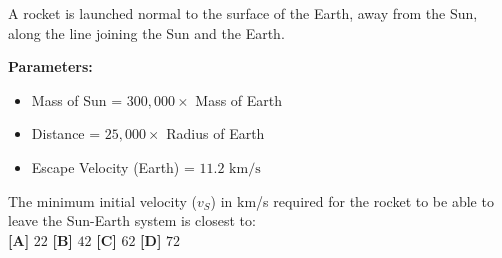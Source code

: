 \begin{minipage}{\linewidth}    
\begin{tcolorbox}[
    title={\small\textbf{JEE Advanced 2017 Paper 2}},
    colback=white,
    colframe=gray!50!black,
    arc=3pt,
    boxrule=1pt,
    fonttitle=\sffamily\large,
    width=\linewidth
]

    \begin{tcolorbox}[
        colback=gray!5,
        colframe=gray!20,
        coltitle=black,
        title={\scriptsize \textbf{QUESTION}},
        fontupper=\small\sffamily,
        boxrule=0.5pt,
        sharp corners,
        left=3pt, right=3pt, top=3pt, bottom=3pt
    ]
        \begin{scriptsize}
            
        A rocket is launched normal to the surface of the Earth, away from the Sun, along the line joining the Sun and the Earth. 
        \vspace{0.5em}
        
        \textbf{Parameters:}
        \begin{itemize}[nosep, leftmargin=1.5em]
            \item Mass of Sun = $300,000 \times$ Mass of Earth
            \item Distance = $25,000 \times$ Radius of Earth
            \item Escape Velocity (Earth) = $11.2\text{ km/s}$
        \end{itemize}
        \vspace{0.5em}
        The minimum initial velocity ($v_S$) in km/s required for the rocket to be able to leave the Sun-Earth system is closest to:\\
        \textbf{[A]} $22$ \quad \textbf{[B]} $42$ \quad \textbf{[C]} $62$ \quad \textbf{[D]} $72$
        \end{scriptsize}
    \end{tcolorbox}

    \vspace{-0.5em}


\end{tcolorbox}
\end{minipage}
